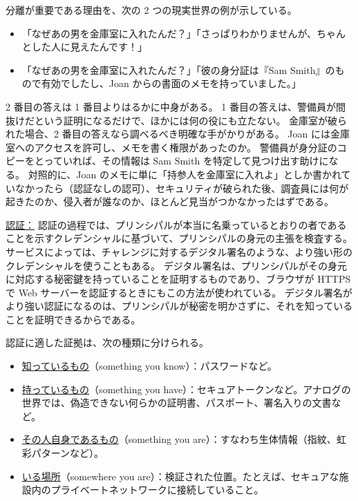 \documentclass[uplatex]{jsarticle}
\def\label#1{}%
\begin{document}
\begin{exa}[金庫室に通した理由]\label{exa:ch1-vault-guard}
分離が重要である理由を、次の 2 つの現実世界の例が示している。
\begin{itemize}
\item 「なぜあの男を金庫室に入れたんだ？」「さっぱりわかりませんが、ちゃんとした人に見えたんです！」
\item 「なぜあの男を金庫室に入れたんだ？」「彼の身分証は『Sam Smith』のもので有効でしたし、Joan からの書面のメモを持っていました。」
\end{itemize}
2 番目の答えは 1 番目よりはるかに中身がある。
1 番目の答えは、警備員が間抜けだという証明になるだけで、ほかには何の役にも立たない。
金庫室が破られた場合、2 番目の答えなら調べるべき明確な手がかりがある。
Joan には金庫室へのアクセスを許可し、メモを書く権限があったのか。
警備員が身分証のコピーをとっていれば、その情報は Sam Smith を特定して見つけ出す助けになる。
対照的に、Joan のメモに単に「持参人を金庫室に入れよ」としか書かれていなかったら（認証なしの認可）、セキュリティが破られた後、調査員には何が起きたのか、侵入者が誰なのか、ほとんど見当がつかなかったはずである。
\end{exa}

\underline{認証：}
認証の過程では、プリンシパルが本当に名乗っているとおりの者であることを示すクレデンシャルに基づいて、プリンシパルの身元の主張を検査する。
サービスによっては、チャレンジに対するデジタル署名のような、より強い形のクレデンシャルを使うこともある。
デジタル署名は、プリンシパルがその身元に対応する秘密鍵を持っていることを証明するものであり、ブラウザが HTTPS で Web サーバーを認証するときにもこの方法が使われている。
デジタル署名がより強い認証になるのは、プリンシパルが秘密を明かさずに、それを知っていることを証明できるからである。

\begin{dfn}[認証の証拠の種類]\label{dfn:ch1-authentication-factors}
認証に適した証拠は、次の種類に分けられる。
\begin{itemize}
\item \underline{知っているもの}（something you know）：パスワードなど。
\item \underline{持っているもの}（something you have）：セキュアトークンなど。アナログの世界では、偽造できない何らかの証明書、パスポート、署名入りの文書など。
\item \underline{その人自身であるもの}（something you are）：すなわち生体情報（指紋、虹彩パターンなど）。
\item \underline{いる場所}（somewhere you are）：検証された位置。たとえば、セキュアな施設内のプライベートネットワークに接続していること。
\end{itemize}
\end{dfn}
\end{document}
